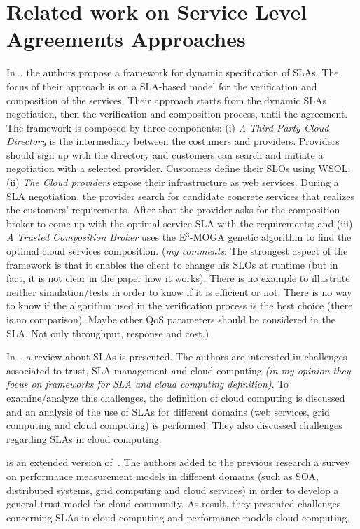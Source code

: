 \documentclass[12pt,a4paper,oneside]{article}
\author{Daniel Aguiar da Silva Carvalho}
\begin{document}
\section{Related work on Service Level Agreements Approaches}

In~\cite{001}, the authors propose a framework for dynamic specification of SLAs. The focus of their approach is on a SLA-based model for the verification and composition of the services. Their approach starts from the dynamic SLAs negotiation, then the verification and composition process, until the agreement. The framework is composed by three components: (i) \textit{A Third-Party Cloud Directory} is the intermediary between the costumers and providers. Providers should sign up with the directory and customers can search and initiate a negotiation with a selected provider. Customers define their SLOs using WSOL; (ii) \textit{The Cloud providers} expose their infrastructure as web services. During a SLA negotiation, the provider search for candidate concrete services that realizes the customers' requirements. After that the provider asks for the composition broker to come up with the optimal service SLA with the requirements; and (iii) \textit{A Trusted Composition Broker} uses the E$^{3}$-MOGA genetic algorithm to find the optimal cloud services composition. (\textit{my comments}: The strongest aspect of the framework is that it enables the client to change his SLOs at runtime (but in fact, it is not clear in the paper how it works). There is no example to illustrate neither simulation/tests in order to know if it is efficient or not. There is no way to know if the algorithm used in the verification process is the best choice (there is no comparison). Maybe other QoS parameters should be considered in the SLA. Not only throughput, response and cost.)

\bigskip
In~\cite{003}, a review about SLAs is presented. The authors are interested in challenges associated to trust, SLA management and cloud computing \textit{(in my opinion they focus on frameworks for SLA and cloud computing definition)}. To examine/analyze this challenges, the definition of cloud computing is discussed and an analysis of the use of SLAs for different domains (web services, grid computing and cloud computing) is performed. They also discussed challenges regarding SLAs in cloud computing.

\bigskip
\cite{004} is an extended version of~\cite{003}. The authors added to the previous research a survey on performance measurement models in different domains (such as SOA, distributed systems, grid computing and cloud services) in order to develop a general trust model for cloud community. As result, they presented challenges concerning SLAs in cloud computing and performance models cloud computing.
\end{document}
